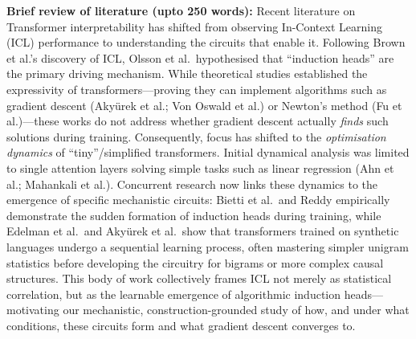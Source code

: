 \documentclass[12pt]{article}
\begin{document}
\medskip
\noindent\textbf{Brief review of literature (upto 250 words):}
Recent literature on Transformer interpretability has shifted from observing In-Context Learning
(ICL) performance to understanding the circuits that enable it. Following Brown et al.'s discovery
of ICL, Olsson et al.\ hypothesised that ``induction heads'' are the primary driving mechanism.
While theoretical studies established the expressivity of transformers---proving they can
implement algorithms such as gradient descent (Aky\"urek et al.; Von Oswald et al.) or Newton's
method (Fu et al.)---these works do not address whether gradient descent actually \emph{finds}
such solutions during training. Consequently, focus has shifted to the \emph{optimisation
dynamics} of ``tiny''/simplified transformers. Initial dynamical analysis was limited to single
attention layers solving simple tasks such as linear regression (Ahn et al.; Mahankali et al.).
Concurrent research now links these dynamics to the emergence of specific mechanistic circuits:
Bietti et al.\ and Reddy empirically demonstrate the sudden formation of induction heads during
training, while Edelman et al.\ and Aky\"urek et al.\ show that transformers trained on synthetic
languages undergo a sequential learning process, often mastering simpler unigram statistics before
developing the circuitry for bigrams or more complex causal structures. This body of work
collectively frames ICL not merely as statistical correlation, but as the learnable emergence of
algorithmic induction heads---motivating our mechanistic, construction-grounded study of how, and
under what conditions, these circuits form and what gradient descent converges to.
\end{document}
